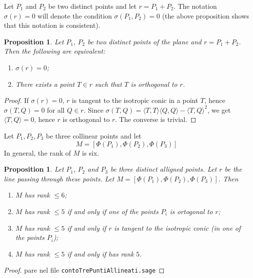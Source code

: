 \documentclass{amsart}
\theoremstyle{plain}
\newtheorem{prop}[theorem]{Proposition}
\theoremstyle{definition}
\newcommand{\scl}[2]{\langle #1, #2 \rangle}
\begin{document}
Let $P_1$ and $P_2$ be two distinct points and let 
$r=P_1+P_2$. The notation $\sigma(r) = 0$ will denote the condition
$\sigma(P_1, P_2) = 0$ (the above proposition shows that this notation
is consistent). 

\begin{prop}
  Let $P_1$, $P_2$ be two distinct points of the plane and $r = P_1+P_2$.
  Then the following are equivalent:
  \begin{enumerate}
  \item $\sigma(r) = 0$;
  \item There exists a point $T \in r$ such that $T$ is orthogonal to $r$.
  \end{enumerate}
\end{prop}
\begin{proof}
  If $\sigma(r) = 0$, $r$ is tangent to the isotropic conic in a
  point $T$, hence $\sigma(T, Q) = 0$ for all $Q\in r$. Since
  $\sigma(T, Q) = \scl{T}{T}\scl{Q}{Q}-\scl{T}{Q}^2$, we get
  $\scl{T}{Q} = 0$, hence $r$ is orthogonal to $r$. The converse is
  trivial. 
\end{proof}

Let $P_1, P_2, P_3$ be three collinear points and let
\[
M = [\Phi(P_1), \Phi(P_2), \Phi(P_3)]
\]
In general, the rank of $M$ is six.

\begin{prop}
  Let $P_1$, $P_2$ and $P_3$ be three distinct alligned points.
  Let $r$ be the line passing through
  these points. Let $M=[\Phi(P_1), \Phi(P_2), \Phi(P_3)]$. Then
  \begin{enumerate}
  \item $M$ has rank $\leq 6$;
  \item $M$ has rank $\leq 5$ if and only if one of the points $P_i$ is
    ortogonal to $r$;
  \item $M$ has rank $\leq 5$ if and only if $r$ is tangent to the
    isotropic conic (in one of the points $P_i$);
  \item $M$ has rank $\leq 5$ if and only if has rank $5$.
  \end{enumerate}
  \label{rk3pt}
\end{prop}
\begin{proof}
pare nel file \verb+contoTrePuntiAllineati.sage+
\end{proof}
\end{document}
